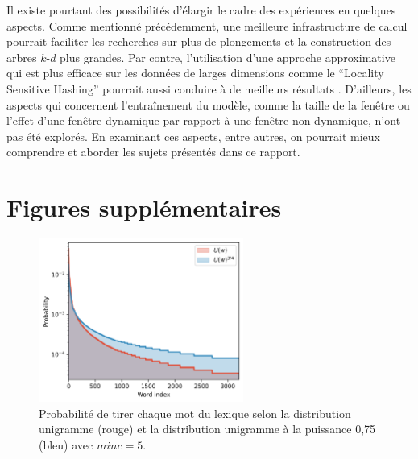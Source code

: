 \documentclass[12pt]{article}
\begin{document}
Il existe pourtant des possibilités d'élargir le cadre des expériences en quelques aspects. Comme mentionné précédemment, une meilleure infrastructure de calcul pourrait faciliter les recherches sur plus de plongements et la construction des arbres $k$-$d$ plus grandes. Par contre, l'utilisation d'une approche approximative qui est plus efficace sur les données de larges dimensions comme le ``Locality Sensitive Hashing'' pourrait aussi conduire à de meilleurs résultats \citep{andoni2008near}. D'ailleurs, les aspects qui concernent l'entraînement du modèle, comme la taille de la fenêtre ou l'effet d'une fenêtre dynamique par rapport à une fenêtre non dynamique, n'ont pas été explorés. En examinant ces aspects, entre autres, on pourrait mieux comprendre et aborder les sujets présentés dans ce rapport. 

\newpage


 

\appendix
\section{Figures supplémentaires}

\begin{figure}[htpb]
    \centering
    \includegraphics[width=0.6\textwidth]{img/unigram.png}
    \caption{Probabilité de tirer chaque mot du lexique selon la distribution unigramme (rouge) et la distribution unigramme à la puissance 0{,}75 (bleu) avec $minc = 5$.}
    \label{fig:unigram}
\end{figure}
\end{document}

